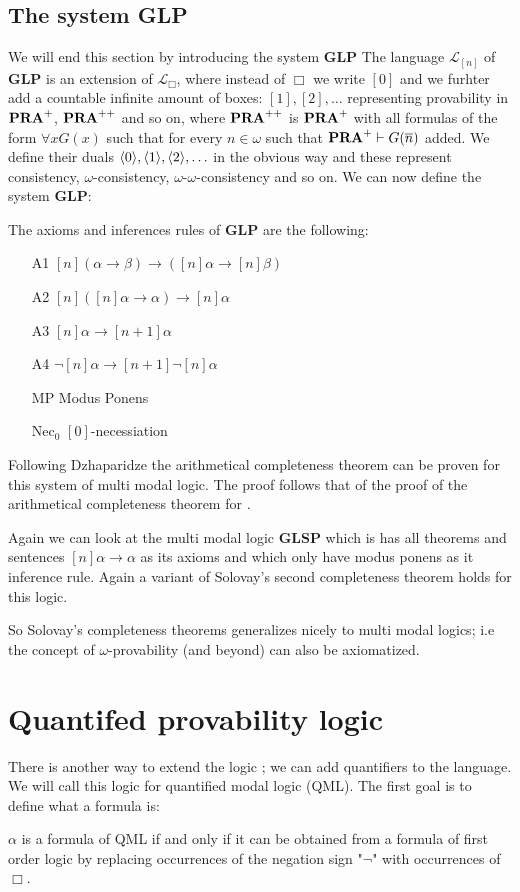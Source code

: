 \documentclass[../main.tex]{subfiles}
\begin{document}
\subsection{The system \textbf{GLP}}
We will end this section by introducing the system \textbf{GLP}
The language $\mathcal{L}_{[n]}$ of \textbf{GLP} is an extension of
$\mathcal{L}_\Box$, where instead of $\Box$ we write $[0]$ and we furhter add
a countable infinite amount of boxes:
$[1],[2],\ldots$ representing provability in $\text{\textbf{PRA}}^+$, $\text{\textbf{PRA}}^{++}$ and so on,
where $\text{\textbf{PRA}}^{++}$ is  $\text{\textbf{PRA}}^+$ with all formulas of the form $\forall x G(x)$
such that for every $n\in\omega$ such that $\text{\textbf{PRA}}^+\vdash G(\overline n)$ added. We
define their duals $\langle 0\rangle,\langle 1\rangle, \langle 2\rangle,\ldots$ in the obvious way and
these represent consistency, $\omega$-consistency,
$\omega$-$\omega$-consistency and so on. We can now define the system
\textbf{GLP}:
\begin{defi}
	The axioms and inferences rules of \textbf{GLP} are the following:
	\begin{enumerate}
		\item[A1]
			$[n](\alpha\rightarrow\beta)\rightarrow([n]\alpha\rightarrow[n]\beta)$
		\item[A2] $[n]([n]\alpha\rightarrow\alpha)\rightarrow[n]\alpha$
		\item[A3] $[n]\alpha\rightarrow[n+1]\alpha$
		\item[A4] $\neg[n]\alpha\rightarrow[n+1]\neg[n]\alpha$
		\item[MP] Modus Ponens
		\item[Nec$_0$] $[0]$-necessiation
	\end{enumerate}
\end{defi}

Following Dzhaparidze the arithmetical completeness theorem can be proven for
this system of multi modal logic. The proof follows that of the proof of the
arithmetical completeness theorem for \GLB.

Again we can look at the multi modal logic \textbf{GLSP} which is has all
theorems and sentences $[n]\alpha\rightarrow\alpha$ as its axioms and which
only have modus ponens as it inference rule. Again a variant of Solovay's
second completeness theorem holds for this logic.

So Solovay's completeness theorems generalizes nicely to multi modal logics;
i.e the concept of $\omega$-provability (and beyond) can also be axiomatized.

\section{Quantifed provability logic}
There is another way to extend the logic \GL; we can add quantifiers to the
language. We will call this logic for quantified modal logic (QML). The first
goal is to define what a formula is:
\begin{defi}
	$\alpha$ is a formula of QML if and only if it can be obtained from a
	formula of first order logic by
	replacing occurrences of the negation sign "$\neg$" with occurrences of
	$\Box$. 
\end{defi}
\end{document}
